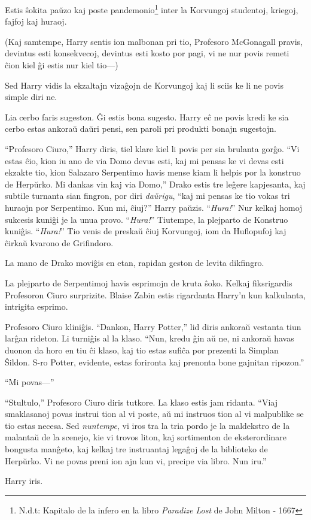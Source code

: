 Estis ŝokita paŭzo kaj poste pandemonio\footnote{N.d.t: Kapitalo de la
infero en la libro \emph{Paradize Lost} de John Milton - 1667} inter
la Korvungoj studentoj, kriegoj, fajfoj kaj huraoj.

(Kaj samtempe, Harry sentis ion malbonan pri tio, Profesoro McGonagall
pravis, devintus esti konsekvecoj, devintus esti kosto por pagi, vi ne
nur povis remeti ĉion kiel ĝi estis nur kiel tio—)

Sed Harry vidis la ekzaltajn vizaĝojn de Korvungoj kaj li sciis ke li
ne povis simple diri ne.

Lia cerbo faris sugeston. Ĝi estis bona sugesto. Harry eĉ ne povis
kredi ke sia cerbo estas ankoraŭ daŭri pensi, sen paroli pri produkti
bonajn sugestojn.

``Profesoro Ciuro,'' Harry diris, tiel klare kiel li povis per sia
brulanta gorĝo. ``Vi estas ĉio, kion iu ano de via Domo devus esti,
kaj mi pensas ke vi devas esti ekzakte tio, kion Salazaro Serpentimo
havis mense kiam li helpis por la konstruo de Herpŭrko. Mi dankas vin
kaj via Domo,'' Drako estis tre leĝere kapjesanta, kaj subtile
turnanta sian fingron, por diri \emph{daŭrigu}, ``kaj mi pensas ke tio
vokas tri huraojn por Serpentimo. Kun mi, ĉiuj?'' Harry
paŭzis. ``\emph{Hura!}'' Nur kelkaj homoj sukcesis kuniĝi je la unua
provo. ``\emph{Hura!}'' Tiutempe, la plejparto de Konstruo
kuniĝis. ``\emph{Hura!}'' Tio venis de preskaŭ ĉiuj Korvungoj, iom da
Huflopufoj kaj ĉirkaŭ kvarono de Grifindoro.

La mano de Drako moviĝis en etan, rapidan geston de levita dikfingro.

La plejparto de Serpentimoj havis esprimojn de kruta ŝoko. Kelkaj
fiksrigardis Profesoron Ciuro surprizite. Blaise Zabin estis
rigardanta Harry'n kun kalkulanta, intrigita esprimo.

Profesoro Ciuro kliniĝis. ``Dankon, Harry Potter,'' lid diris ankoraŭ
vestanta tiun larĝan rideton. Li turniĝis al la klaso. ``Nun, kredu
ĝin aŭ ne, ni ankoraŭ havas duonon da horo en tiu ĉi klaso, kaj tio
estas sufiĉa por prezenti la Simplan Ŝildon. S-ro Potter, evidente,
estas forironta kaj prenonta bone gajnitan ripozon.''

``Mi povas—''

``Stultulo,'' Profesoro Ciuro diris tutkore. La klaso estis jam
ridanta. ``Viaj smaklasanoj povas instrui tion al vi poste, aŭ mi
instruos tion al vi malpublike se tio estas necesa. Sed
\emph{nuntempe}, vi iros tra la tria pordo je la maldekstro de la
malantaŭ de la scenejo, kie vi trovos liton, kaj sortimenton de
eksterordinare bongusta manĝeto, kaj kelkaj tre instruantaj legaĝoj de
la biblioteko de Herpŭrko. Vi ne povas preni ion ajn kun vi, precipe
via libro. Nun iru.''

Harry iris.
